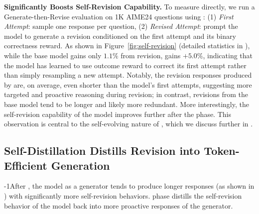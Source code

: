 
\textbf{\sft{} Significantly Boosts Self-Revision Capability.}
To measure directly, we run a Generate-then-Revise evaluation on 1K AIME24 questions using \qwen{}: (1) \textit{First Attempt}: sample one response per question, (2) \textit{Revised Attempt}: prompt the model to generate a revision conditioned on the first attempt and its binary correctness reward. As shown in Figure~\ref{fig:self-revision} (detailed statistics in ), while the base model gains only $1.1\%$ from revision, \sft{} gains $+5.0\%$, indicating that the \sft{} model has learned to use outcome reward to correct its first attempt rather than simply resampling a new attempt. 
Notably, the revision responses produced by \sft{} are, on average, even shorter than the model’s first attempts, suggesting more targeted and proactive reasoning during revision; in contrast, revisions from the base model tend to be longer and likely more redundant. More interestingly, the self-revision capability of the model improves further after the \opsd{} phase. This observation is central to the self-evolving nature of \ours{}, which we discuss further in .



\subsection{Self-Distillation Distills Revision into Token-Efficient Generation}
\label{sec:distillation-results}

\looseness-1After \sft{}, the model as a generator tends to produce longer responses (as shown in ) with significantly more self-revision behaviors.
\opsd{} phase distills the self-revision behavior of the model back into more proactive responses of the generator.


